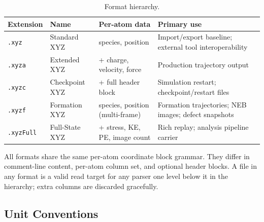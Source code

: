\documentclass[11pt, a4paper, oneside]{article}
\begin{document}
\begin{table}[h]
\centering
\begin{tabular}{lllp{5.2cm}}
  \toprule
  Extension & Name & Per-atom data & Primary use \\
  \midrule
  \texttt{.xyz}     & Standard XYZ    & species, position
    & Import/export baseline; external tool interoperability \\
  \texttt{.xyza}    & Extended XYZ    & + charge, velocity, force
    & Production trajectory output \\
  \texttt{.xyzc}    & Checkpoint XYZ  & + full header block
    & Simulation restart; checkpoint/restart files \\
  \texttt{.xyzf}    & Formation XYZ   & species, position (multi-frame)
    & Formation trajectories; NEB images; defect snapshots \\
  \texttt{.xyzFull} & Full-State XYZ  & + stress, KE, PE, image count
    & Rich replay; analysis pipeline carrier \\
  \bottomrule
\end{tabular}
\caption{Format hierarchy.}
\label{tab:hierarchy}
\end{table}

All formats share the same per-atom coordinate block grammar. They differ
in comment-line content, per-atom column set, and optional header blocks.
A file in any format is a valid read target for any parser one level below
it in the hierarchy; extra columns are discarded gracefully.

\subsection{Unit Conventions}
\label{sec:units}
\end{document}
